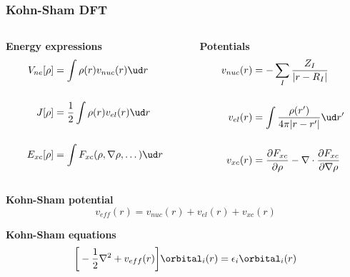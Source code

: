 \begin{frame}
    \frametitle{Kohn-Sham DFT}
    \centering
    \begin{columns}
    \begin{column}{.50\textwidth}
    \centering
    \textbf{Energy expressions}
    \begin{align}
	\nonumber
	V_{ne}[\rho]	&= \int \rho(r)v_{nuc}(r)\ud r\\
	\nonumber
			&\\
	\nonumber
	J[\rho] &= \frac{1}{2} \int \rho(r)v_{el}(r)\ud r\\
	\nonumber
			&\\
	\nonumber
	E_{xc}[\rho]	&= \int F_{xc}(\rho, \nabla\rho, \dots) \ud r
    \end{align}
    \end{column}
    \begin{column}{.50\textwidth}
    \centering
    \textbf{Potentials}
    \begin{align}
	\nonumber
	v_{nuc}(r) &=
        -\sum_I\frac{Z_I}{|r-R_I|}\\
	\nonumber
			&\\
	\nonumber
	v_{el}(r) &=
	\int \frac{\rho(r')}{4\pi|r-r'|} \ud r'\\
	\nonumber
			&\\
	\nonumber
	v_{xc}(r) &=
        \frac{\partial F_{xc}}{\partial \rho} - \nabla \cdot \frac{\partial
        F_{xc}}{\partial \nabla \rho}
    \end{align}
    \end{column}
    \end{columns}    

    \vspace{5mm}

    \centering
    \textbf{Kohn-Sham potential}
    \begin{equation}
        \nonumber
        v_{eff}(r) = v_{nuc}(r) + v_{el}(r) + v_{xc}(r)
    \end{equation}

    \vspace{5mm}

    \centering
    \textbf{Kohn-Sham equations}
    \begin{equation}
	\nonumber
	\bigg[-\frac{1}{2}\nabla^2 + v_{eff}(r)\bigg]\orbital_i(r) = \epsilon_i \orbital_i(r)
    \end{equation}

\end{frame}

